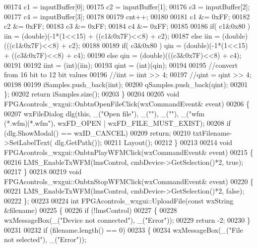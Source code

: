 \begin{DoxyCode}
{00174         c1 = inputBuffer[0];
00175         c2 = inputBuffer[1];
00176         c3 = inputBuffer[2];
00177         c4 = inputBuffer[3];
00178 
00179         cnt++;
00180 
00181         c1 &= 0xFF;
00182         c2 &= 0xFF;
00183         c3 &= 0xFF;
00184         c4 &= 0xFF;
00185 
00186         \textcolor{keywordflow}{if}( c1&0x80 ) iin = (double)(-1*(1<<15) + ((c1&0x7F)<<8) + c2);
00187         \textcolor{keywordflow}{else} iin = (double)(((c1&0x7F)<<8) + c2);
00188 
00189         \textcolor{keywordflow}{if}( c3&0x80 ) qin = (double)(-1*(1<<15) + ((c3&0x7F)<<8) + c4);
00190         \textcolor{keywordflow}{else} qin = (double)(((c3&0x7F)<<8) + c4);
00191 
00192         iint = (int)(iin);
00193         qint = (int)(qin);
00194 
00195         \textcolor{comment}{//convert from 16 bit to 12 bit values}
00196         \textcolor{comment}{//iint = iint >> 4;}
00197         \textcolor{comment}{//qint = qint >> 4;}
00198 
00199         iSamples.push\_back(iint);
00200         qSamples.push\_back(qint);
00201     \};
00202     \textcolor{keywordflow}{return} iSamples.size();
00203 \}
00204 
00205 \textcolor{keywordtype}{void} FPGAcontrols_wxgui::OnbtnOpenFileClick(wxCommandEvent& event)
00206 \{
00207     wxFileDialog dlg(\textcolor{keyword}{this}, \_(\textcolor{stringliteral}{"Open file"}), \_(\textcolor{stringliteral}{""}), \_(\textcolor{stringliteral}{""}), \_(\textcolor{stringliteral}{"wfm (*.wfm)|*.wfm"}), wxFD\_OPEN | 
      wxFD\_FILE\_MUST\_EXIST);
00208     \textcolor{keywordflow}{if} (dlg.ShowModal() == wxID\_CANCEL)
00209         \textcolor{keywordflow}{return};
00210     txtFilename->SetLabelText( dlg.GetPath());
00211     Layout();
00212 \}
00213 
00214 \textcolor{keywordtype}{void} FPGAcontrols_wxgui::OnbtnPlayWFMClick(wxCommandEvent& event)
00215 \{ 
00216     LMS_EnableTxWFM(lmsControl, cmbDevice->GetSelection()*2, \textcolor{keyword}{true});
00217 \}
00218 
00219 \textcolor{keywordtype}{void} FPGAcontrols_wxgui::OnbtnStopWFMClick(wxCommandEvent& event)
00220 \{
00221     LMS_EnableTxWFM(lmsControl, cmbDevice->GetSelection()*2, \textcolor{keyword}{false});
00222 \};
00223 
00224 \textcolor{keywordtype}{int} FPGAcontrols_wxgui::UploadFile(\textcolor{keyword}{const} wxString &filename)
00225 \{
00226     \textcolor{keywordflow}{if} (!lmsControl)
00227     \{
00228         wxMessageBox(\_(\textcolor{stringliteral}{"Device not connected"}), \_(\textcolor{stringliteral}{"Error"}));
00229         \textcolor{keywordflow}{return} -2;
00230     \}
00231 
00232     \textcolor{keywordflow}{if} (filename.length() == 0)
00233     \{
00234         wxMessageBox(\_(\textcolor{stringliteral}{"File not selected"}), \_(\textcolor{stringliteral}{"Error"}));
}
\end{DoxyCode}
